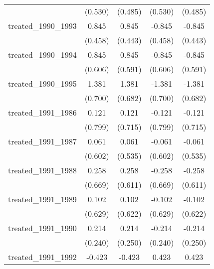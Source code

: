 {\begin{tabular}{l*{4}{c}}
            &     (0.530)         &     (0.485)         &     (0.530)         &     (0.485)         \\
[1em]
treated\_1990\_1993&       0.845         &       0.845         &      -0.845         &      -0.845         \\
            &     (0.458)         &     (0.443)         &     (0.458)         &     (0.443)         \\
[1em]
treated\_1990\_1994&       0.845         &       0.845         &      -0.845         &      -0.845         \\
            &     (0.606)         &     (0.591)         &     (0.606)         &     (0.591)         \\
[1em]
treated\_1990\_1995&       1.381\sym{*}  &       1.381\sym{*}  &      -1.381\sym{*}  &      -1.381\sym{*}  \\
            &     (0.700)         &     (0.682)         &     (0.700)         &     (0.682)         \\
[1em]
treated\_1991\_1986&       0.121         &       0.121         &      -0.121         &      -0.121         \\
            &     (0.799)         &     (0.715)         &     (0.799)         &     (0.715)         \\
[1em]
treated\_1991\_1987&       0.061         &       0.061         &      -0.061         &      -0.061         \\
            &     (0.602)         &     (0.535)         &     (0.602)         &     (0.535)         \\
[1em]
treated\_1991\_1988&       0.258         &       0.258         &      -0.258         &      -0.258         \\
            &     (0.669)         &     (0.611)         &     (0.669)         &     (0.611)         \\
[1em]
treated\_1991\_1989&       0.102         &       0.102         &      -0.102         &      -0.102         \\
            &     (0.629)         &     (0.622)         &     (0.629)         &     (0.622)         \\
[1em]
treated\_1991\_1990&       0.214         &       0.214         &      -0.214         &      -0.214         \\
            &     (0.240)         &     (0.250)         &     (0.240)         &     (0.250)         \\
[1em]
treated\_1991\_1992&      -0.423         &      -0.423         &       0.423         &       0.423         \\

\end{tabular}}
